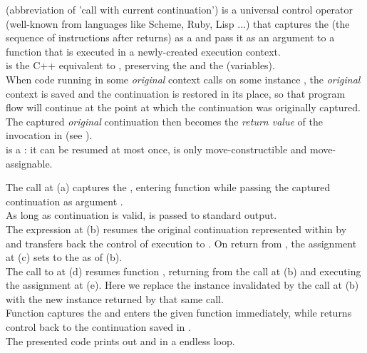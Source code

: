 
\cc (abbreviation of 'call with current continuation') is a universal control
operator (well-known from languages like Scheme, Ruby, Lisp ...) that captures
the \currcont (the sequence of instructions after \cc returns) as a
 and pass it as an argument to a function that is
executed in a newly-created execution context.\\

\callcc is the C++ equivalent to \cc, preserving the  and the
 (variables).\\

When code running in some \emph{original} context calls \resume on some \cont
instance , the \emph{original} context is saved and
the  continuation is restored in its place, so that program flow
will continue at the point at which the  continuation was
originally captured. The captured \emph{original} continuation then becomes
the \emph{return value} of the \callcc invocation in 
(see ).\\

\cont is a : it can be resumed at most once, is only
move-constructible and move-assignable.

The  call at (a) captures the \currcont, entering function
 while passing the captured continuation as argument .\\
As long as continuation  is valid,  is passed to standard
output.\\
The expression  at (b) resumes the original
continuation represented within  by  and transfers back the
control of execution to . On return from ,
the assignment at (c) sets  to the \currcont as of (b).\\
The call to  at (d)
resumes function , returning from the \resume call at (b) and executing
the assignment at (e). Here we replace the \cont instance 
invalidated by the \resume call at (b) with the new instance returned by that
same \resume call.\\
Function \callcc captures the \currcont and enters the given function immediately,
while \resume returns control back to the continuation saved in .\\
The presented code prints out  and  in a endless loop.\\

